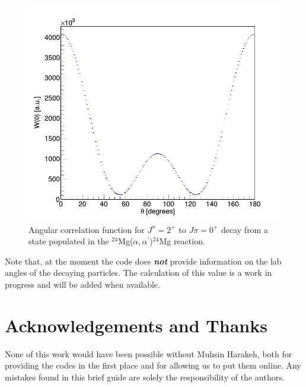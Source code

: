 \documentclass[a4paper,10pt]{article}
\begin{document}
\begin{figure}
 \includegraphics[width=\textwidth]{QuadrupoleAlphaDecayExample.png}
  \caption{Angular correlation function for $J^\pi = 2^+$ to $J\pi = 0^+$ decay from a state populated in the $^{24}$Mg($\alpha,\alpha^\prime$)$^{24}$Mg reaction.}
  \label{fig:2plusTo0PlusAlphaEmission}
\end{figure}


Note that, at the moment the code does {\it \bf not} provide information on the lab angles of the decaying particles. The calculation of this value is a work in progress and will be added when available.

\section{Acknowledgements and Thanks}

None of this work would have been possible without Muhsin Harakeh, both for providing the codes in the first place and for allowing us to put them online. Any mistakes found in this brief guide are solely the responsibility of the authors.


\end{document}
